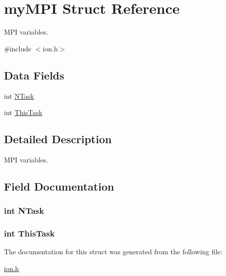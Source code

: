 \hypertarget{structmy_m_p_i}{\section{my\+M\+P\+I Struct Reference}
\label{structmy_m_p_i}
}


M\+P\+I variables.  




{\ttfamily \#include $<$ion.\+h$>$}

\subsection*{Data Fields}
\begin{DoxyCompactItemize}
\item 
int \hyperlink{structmy_m_p_i_a675acdcd149f5993271a1fdc11673b65}{N\+Task}
\item 
int \hyperlink{structmy_m_p_i_a52c8c7d2abff436111942e02c5bb466a}{This\+Task}
\end{DoxyCompactItemize}


\subsection{Detailed Description}
M\+P\+I variables. 

\subsection{Field Documentation}
\hypertarget{structmy_m_p_i_a675acdcd149f5993271a1fdc11673b65}{
\subsubsection[{N\+Task}]{\setlength{\rightskip}{0pt plus 5cm}int N\+Task}}\label{structmy_m_p_i_a675acdcd149f5993271a1fdc11673b65}
\hypertarget{structmy_m_p_i_a52c8c7d2abff436111942e02c5bb466a}{
\subsubsection[{This\+Task}]{\setlength{\rightskip}{0pt plus 5cm}int This\+Task}}\label{structmy_m_p_i_a52c8c7d2abff436111942e02c5bb466a}


The documentation for this struct was generated from the following file\+:\begin{DoxyCompactItemize}
\item 
\hyperlink{ion_8h}{ion.\+h}\end{DoxyCompactItemize}
